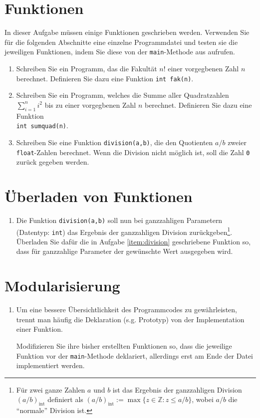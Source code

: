 \documentclass[paper=a4, fontsize=11pt, twoside]{scrartcl}
\begin{document}
\section*{Funktionen}\label{sec:funktionen}
In dieser Aufgabe müssen einige Funktionen geschrieben werden. Verwenden Sie für die folgenden Abschnitte eine einzelne Programmdatei und testen sie die jeweiligen Funktionen, indem Sie diese von der \texttt{main}-Methode aus aufrufen.
\begin{enumerate}[resume]
\item Schreiben Sie ein Programm, das die Fakultät $n!$ einer vorgegbenen Zahl $n$ berechnet. Definieren Sie dazu eine Funktion \texttt{int fak(n)}. 
  \item Schreiben Sie ein Programm, welches die Summe aller Quadratzahlen $\sum\limits_{i=1}^{n}i^2$ bis zu einer vorgegbenen Zahl $n$ berechnet. Definieren Sie dazu eine Funktion \\ \texttt{int sumquad(n)}.
  \item Schreiben Sie eine Funktion \texttt{division(a,b)}, die den Quotienten $a/b$ zweier \texttt{float}-Zahlen berechnet. Wenn die Division nicht möglich ist, soll die Zahl \texttt{0} zurück gegeben werden.\label{item:division}
\end{enumerate}

\section*{Überladen von Funktionen}\label{sec:uberl-von-funktionen}
\begin{enumerate}[resume]
\item Die Funktion \texttt{division(a,b)} soll nun bei ganzzahligen Parametern (Datentyp: \texttt{int}) das Ergebnis der ganzzahligen Division zurückgeben\footnote{Für zwei ganze Zahlen $a$ und $b$ ist das Ergebnis der ganzzahligen Division $(a/b)_{\mathrm{int}}$ definiert als $(a/b)_{\mathrm{int}}:= \max\{z \in \mathbb{Z}:z\le a/b \}$, wobei $a/b$ die ``normale'' Division ist.}. Überladen Sie dafür die in Aufgabe \ref{item:division} geschriebene Funktion so, dass für ganzzahlige Parameter der gewünschte Wert ausgegeben wird. 
\end{enumerate}

\section*{Modularisierung}\label{sec:modularisierung}
\begin{enumerate}[resume]
\item Um eine bessere Übersichtlichkeit des Programmcodes zu gewährleisten, trennt man häufig die Deklaration (s.g. Prototyp) von der Implementation einer Funktion. \par
Modifizieren Sie ihre bisher erstellten Funktionen so, dass die jeweilige Funktion vor der \texttt{main}-Methode deklariert, allerdings erst am Ende der Datei implementiert werden.
\end{enumerate}
\end{document}
